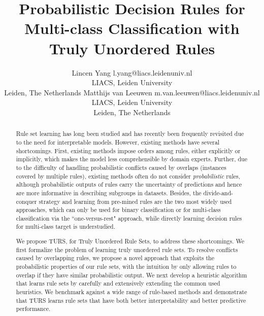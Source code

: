 \documentclass[twoside,11pt]{article}
\begin{document}
\title{Probabilistic Decision Rules for Multi-class Classification with Truly Unordered Rules}

\author{\name Lincen Yang \email l.yang@liacs.leidenuniv.nl \\
       \addr LIACS, 
       Leiden University\\
       Leiden, The Netherlands
       \AND
       \name Matthijs van Leeuwen \email m.van.leeuwen@liacs.leidenuniv.nl \\
       \addr LIACS, 
       Leiden University\\
       Leiden, The Netherlands}


\maketitle

\begin{abstract}%
Rule set learning has long been studied and has recently been frequently revisited due to the need for interpretable models. However, existing methods have several shortcomings. First, existing methods impose orders among rules, either explicitly or implicitly, which makes the model less comprehensible by domain experts. Further, due to the difficulty of handling probabilistic conflicts caused by overlaps (instances covered by multiple rules), existing methods often do not consider \emph{probabilistic} rules, although probabilistic outputs of rules carry the uncertainty of predictions and hence are more informative in describing subgroups in datasets. Besides, the divide-and-conquer strategy and learning from pre-mined rules are the two most widely used approaches, which can only be used for binary classification or for multi-class classification via the ``one-versus-rest" approach, while directly learning decision rules for multi-class target is understudied. 

We propose TURS, for Truly Unordered Rule Sets, to address these shortcomings. We first formalize the problem of learning truly unordered rule sets. To resolve conflicts caused by overlapping rules, we propose a novel approach that exploits the probabilistic properties of our rule sets, with the intuition by only allowing rules to overlap if they have similar probabilistic output. We next develop a heuristic algorithm that learns rule sets by carefully and extensively extending the common used heuristics. We benchmark against a wide range of rule-based methods and demonstrate that TURS learns rule sets that have both better interpretability and better predictive performance. 





\end{abstract}
\end{document}
